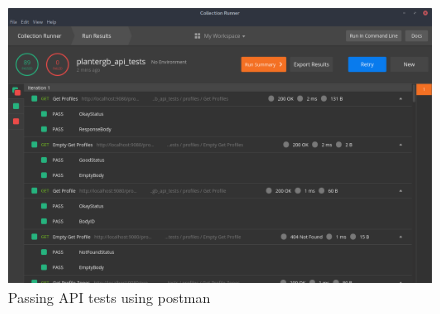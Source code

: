 \documentclass[onecolumn, draftclsnofoot,10pt, compsoc]{IEEEtran}
\begin{document}
	\begin{center}
		\begin{figure}[H]
			\includegraphics[width=\linewidth]{tests/api_tests.png}
			\caption{Passing API tests using postman}
			\label{fig:apiTests}
		\end{figure}
	\end{center}
	
\end{document}
